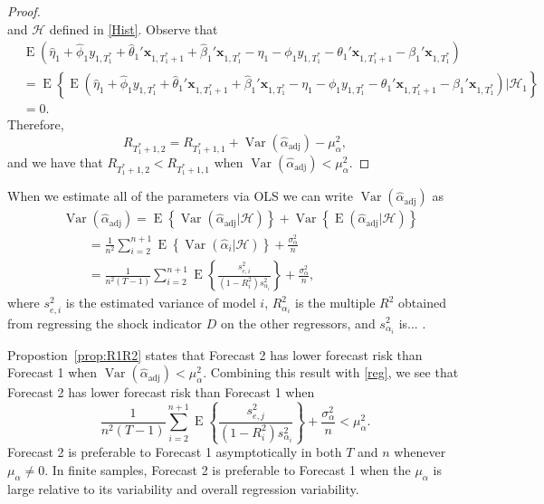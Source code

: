 \documentclass[11pt]{article}
\newcommand{\x}{\textbf{x}}
\newcommand{\Hist}{\mathcal{H}}
\DeclareMathOperator{\E}{E}
\DeclareMathOperator{\Var}{Var}
\begin{document}
\begin{proof}
$$$$
and $\Hist$ defined in \eqref{Hist}.  Observe that 
\begin{align*}
  &\E\left(\hat\eta_1 + \hat\phi_1 y_{1,T_1^*} + \hat\theta_1'\x_{1,T_1^*+1} 
    + \hat\beta_1'\x_{1,T_1^*} - \eta_1 - \phi_1 y_{1,T_1^*} 
    - \theta_1'\x_{1,T_1^*+1} - \beta_1'\x_{1,T_1^*}\right) \\
  &= \E\left\{\E\left(\hat\eta_1 + \hat\phi_1 y_{1,T_1^*} 
    + \hat\theta_1'\x_{1,T_1^*+1} + \hat\beta_1'\x_{1,T_1^*} - \eta_1 
    - \phi_1 y_{1,T_1^*} - \theta_1'\x_{1,T_1^*+1} 
    - \beta_1'\x_{1,T_1^*}\right)|\Hist_1\right\} \\
  &= 0.
\end{align*}
Therefore,
$$
  R_{T_1^*+1, 2} = R_{T_1^*+1, 1} + \Var(\hat{\alpha}_{\text{adj}}) - \mu_{\alpha}^2,
$$ 
and we have that $R_{T_1^*+1, 2} < R_{T_1^*+1, 1}$ when 
$\Var(\hat{\alpha}_{\text{adj}}) < \mu_{\alpha}^2$.
\end{proof}



When we estimate all of the parameters via OLS we can write 
$\Var(\hat{\alpha}_{\text{adj}})$ as
\begin{equation}
\begin{split}
  &\Var(\hat{\alpha}_{\text{adj}}) = \E\left\{\Var(\hat{\alpha}_{\text{adj}}|\Hist)\right\} 
    + \Var\left\{\E(\hat{\alpha}_{\text{adj}}|\Hist)\right\} \\
  &\qquad= \frac{1}{n^2} \sum_{i=2}^{n+1} \E\left\{\Var(\hat{\alpha}_i|\Hist)\right\} 
    + \frac{\sigma_{\alpha}^2}{n} \\
  &\qquad= \frac{1}{n^2(T-1)}\sum_{i=2}^{n+1} 
    \E\left\{\frac{s_{e,i}^2}{(1-R^2_i)s_{\alpha_i}^2}\right\} 
      + \frac{\sigma_{\alpha}^2}{n},
\label{reg}
\end{split}
\end{equation}
where $s_{e,i}^2$ is the estimated variance of model $i$, $R^2_{\alpha_i}$ is 
the multiple $R^2$ obtained from regressing the shock indicator $D$ on the 
other regressors, and $s_{\alpha_i}^2$ is... .

Propostion~\ref{prop:R1R2} states that Forecast 2 has lower forecast risk 
than Forecast 1 when  
$
  \Var(\hat{\alpha}_{\text{adj}}) 
    < \mu_{\alpha}^2.
$
Combining this result with \eqref{reg}, we see that Forecast 2 has lower 
forecast risk than Forecast 1 when 
$$
  \frac{1}{n^2(T-1)}\sum_{i=2}^{n+1} \E\left\{\frac{s_{e,j}^2}{(1-R^2_i)s_{\alpha_i}^2}\right\} 
    + \frac{\sigma_{\alpha}^2}{n} < \mu_{\alpha}^2.
$$
Forecast 2 is preferable to Forecast 1 asymptotically in both $T$ and $n$ 
whenever $\mu_{\alpha} \neq 0$. In finite samples, Forecast 2 is preferable to 
Forecast 1 when the $\mu_{\alpha}$ is large relative to its variability and 
overall regression variability.  











\end{document}
